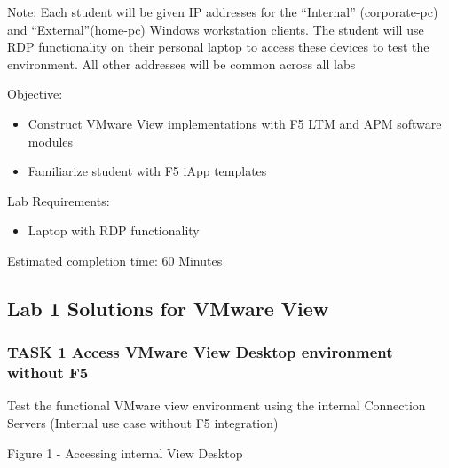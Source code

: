 \documentclass[letterpaper,10pt,english]{sphinxmanual}
\begin{document}
Note: Each student will be given IP addresses for the “Internal”
(corporate-pc) and “External”(home-pc) Windows workstation clients. The
student will use RDP functionality on their personal laptop to access
these devices to test the environment. All other addresses will be
common across all labs

Objective:
\begin{itemize}
\item {} 
Construct VMware View implementations with F5 LTM and APM software
modules

\item {} 
Familiarize student with F5 iApp templates

\end{itemize}

Lab Requirements:
\begin{itemize}
\item {} 
Laptop with RDP functionality

\end{itemize}

Estimated completion time: 60 Minutes


\subsection{Lab 1 \textendash{} Solutions for VMware View}
\label{\detokenize{class2/module1/lab1:lab-1-solutions-for-vmware-view}}\label{\detokenize{class2/module1/lab1::doc}}

\subsubsection{TASK 1 \textendash{} Access VMware View Desktop environment without F5}
\label{\detokenize{class2/module1/lab1:task-1-access-vmware-view-desktop-environment-without-f5}}
Test the functional VMware view environment using the internal
Connection Servers (Internal use case without F5 integration)


Figure 1 - Accessing internal View Desktop\textendash{}
\end{document}
